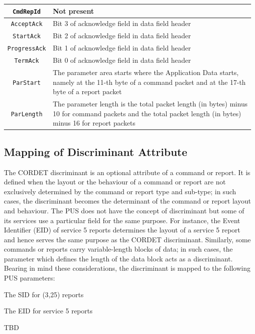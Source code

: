 \documentclass[a4paper,10pt]{article}
\newenvironment{fw_itemize}						%
{\begin{itemize}
  \setlength{\itemsep}{1mm}
  \setlength{\parskip}{0pt}
  \setlength{\parsep}{0pt}}
{\end{itemize}}
\begin{document}
\begin{longtable}{|c|>{\raggedright\arraybackslash}p{11cm}|}
\hline
\texttt{CmdRepId} & Not present \\
\hline
\texttt{AcceptAck} & Bit 3 of acknowledge field in data field header \\
\hline
\texttt{StartAck} & Bit 2 of acknowledge field in data field header \\
\hline
\texttt{ProgressAck} & Bit 1 of acknowledge field in data field header \\
\hline
\texttt{TermAck} & Bit 0 of acknowledge field in data field header \\
\hline
\texttt{ParStart} & The parameter area starts where the Application Data starts, namely at the 11-th byte of a command packet and at the 17-th byte of a report packet \\
\hline
\texttt{ParLength} & The parameter length is the total packet length (in bytes) minus 10 for command packets and the total packet length (in bytes) minus 16 for report packets \\
\hline
\end{longtable}  


\subsection{Mapping of Discriminant Attribute}\label{sec:mapDisc}
The CORDET discriminant is an optional attribute of a command or report. It is defined when the layout or the behaviour of a command or report are not exclusively determined by the command or report type and sub-type; in such cases, the discriminant becomes the determinant of the command or report layout and behaviour. The PUS does not have the concept of discriminant but some of its services use a particular field for the same purpose. For instance, the Event Identifier (EID) of service 5 reports determines the layout of a service 5 report and hence serves the same purpose as the CORDET discriminant. Similarly, some commands or reports carry variable-length blocks of data; in such cases, the parameter which defines the length of the data block acts as a discriminant. Bearing in mind these considerations, the discriminant is mapped to the following PUS parameters:

\begin{fw_itemize}
\item The SID for (3,25) reports
\item The EID for service 5 reports
\item TBD
\end{fw_itemize}
\end{document}
